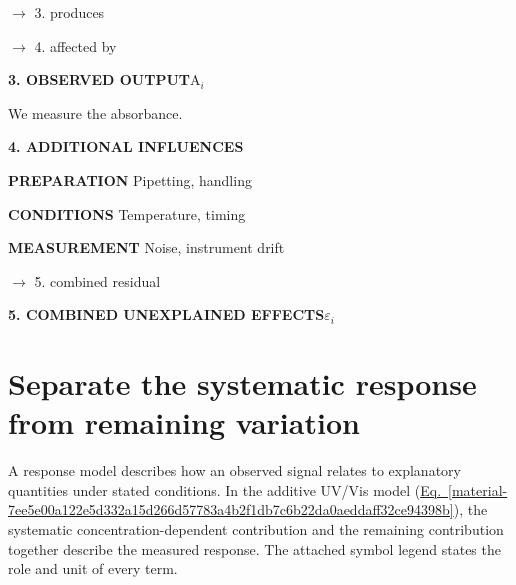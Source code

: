 \documentclass[11pt,a4paper]{article}
\begin{document}
\par\noindent $\longrightarrow$ 3. produces
\par\noindent $\longrightarrow$ 4. affected by
\par\medskip\noindent\textcolor{pcd3}{\textbf{3. OBSERVED OUTPUT}}\quad A\ensuremath{{}_i}\par
We measure the absorbance.


\par\medskip\noindent\textcolor{pcd4}{\textbf{4. ADDITIONAL INFLUENCES}}\par

\par\textbf{PREPARATION} Pipetting, handling
\par\textbf{CONDITIONS} Temperature, timing
\par\textbf{MEASUREMENT} Noise, instrument drift
\par\noindent $\longrightarrow$ 5. combined residual
\par\medskip\noindent\textcolor{pcd5}{\textbf{5. COMBINED UNEXPLAINED EFFECTS}}\quad \ensuremath{\varepsilon}\ensuremath{{}_i}\par



\medskip

\clearpage
\section{Separate the systematic response from remaining variation}
A response model describes how an observed signal relates to explanatory quantities under stated conditions. In the additive UV/Vis model (\hyperref[material-7ee5e00a122e5d332a15d266d57783a4b2f1db7c6b22da0aeddaff32ce94398b]{Eq.~\ref*{material-7ee5e00a122e5d332a15d266d57783a4b2f1db7c6b22da0aeddaff32ce94398b}}), the systematic concentration-dependent contribution and the remaining contribution together describe the measured response. The attached symbol legend states the role and unit of every term.
\end{document}
